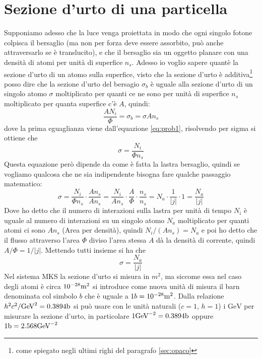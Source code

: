 \documentclass[11pt,a4paper]{article}
\begin{document}
	\section{Sezione d'urto di una particella}
		Supponiamo adesso che la luce venga proiettata in modo che ogni singolo fotone colpisca il bersaglio (ma non per forza deve essere assorbito, può anche attraversarlo se è translucito), e che il bersaglio sia un oggetto planare con una densità di atomi per unità di superfice $n_s$.\newline
		Adesso io voglio sapere quantè la sezione d'urto di un atomo sulla superfice, visto che la sezione d'urto è additiva\footnote{come spiegato negli ultimi righi del paragrafo \ref{sec:opaco}} posso dire che la sezione d'urto del bersagio $\sigma_b$ è uguale alla sezione d'urto di un singolo atomo $\sigma$ moltiplicato per quanti ce ne sono per unità di superfice $n_s$ moltiplicato per quanta superfice c'è $A$, quindi:
		\[
			\frac{AN_i}\Phi=\sigma_b=\sigma A n_s
		\]
		dove la prima eguaglianza viene dall'equazione \ref{eq:prob1}, risolvendo per sigma si ottiene che 
		\begin{equation}
			\sigma=\frac{N_i}{\Phi n_s}
			\label{eq:sez_lastra}
		\end{equation}
		Questa equazione però dipende da come è fatta la lastra bersaglio, quindi se vogliamo qualcosa che ne sia indipendente bisogna fare qualche passaggio matematico:
		\[
			\sigma=\frac{N_i}{\Phi n_s}\cdot \frac{An_s}{An_s}=
			\frac{N_i}{An_s}\cdot\frac A\Phi\cdot \frac {n_s}{n_s}=
			N_a\cdot \frac1{|j|}\cdot 1=\frac{N_a}{|j|}
		\]
		Dove ho detto che il numero di interazioni sulla lastra per unità di tempo $N_i$ è uguale al numero di interazioni su un singolo atomo $N_a$ moltiplicato per quanti atomi ci sono $An_s$ (Area per densità), quindi $N_i/(An_s)=N_a$ e poi ho detto che il flusso attraverso l'area $\Phi$ diviso l'area stessa $A$ dà la densità di corrente, quindi $A/\Phi=1/|j|$.\newline
		Mettendo tutti insieme si ha che 
		\begin{equation}
			\sigma=\frac{N_a}{|j|}
		\end{equation}
		Nel sistema MKS la sezione d'urto si misura in $m^2$, ma siccome essa nel caso degli atomi è circa $10^{-28}\textrm m^2$ si introduce come nuova unità di misura il barn denominata col simbolo $b$ che è uguale a $1b=10^{-28}\textrm m^2$.\newline
		Dalla relazione $h^2c^2/\textrm {GeV}^2=0.3894\textrm b$ si può usare con le unità naturali ($c=1$, $h=1$) i $\textrm {GeV}$ per misurare la sezione d'urto, in particolare $1\textrm{GeV}^{-2}=0.3894\textrm b$ oppure $1\textrm b=2.568\textrm{GeV}^{-2}$
\end{document}
